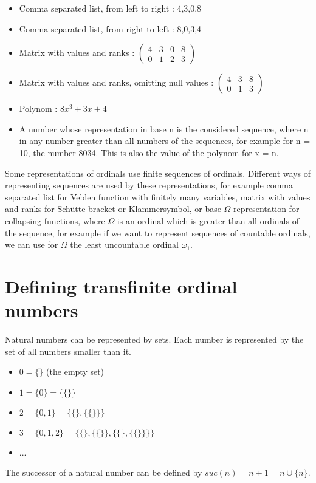 \documentclass[10pt]{article}
\begin{document}
\begin{itemize}
     \setlength{\itemsep}{1pt}
     \setlength{\parskip}{0pt}
     \setlength{\parsep}{0pt}
\item Comma separated list, from left to right : 4,3,0,8
\item Comma separated list, from right to left : 8,0,3,4
\item Matrix with values and ranks :
\(
  \begin{pmatrix}
    4 & 3 & 0 & 8 \\
    0 & 1 & 2 & 3
  \end{pmatrix}
\)
\item Matrix with values and ranks, omitting null values :
\(
  \begin{pmatrix}
    4 & 3 & 8 \\
    0 & 1 & 3
  \end{pmatrix}
\)
\item Polynom : \( 8 x^3 + 3 x + 4 \)
\item A number whose representation in base n is the considered sequence, where n in any number greater than all numbers of the sequences, for example for n = 10, the number 8034. This is also the value of the polynom for x = n.
\end{itemize}

Some representations of ordinals use finite sequences of ordinals. Different ways of representing sequences are used by these representations, for example comma separated list for Veblen function with finitely many variables, matrix with values and ranks for Schütte bracket or Klammersymbol, or base \( \Omega \) representation for collapsing functions, where \( \Omega \) is an ordinal which is greater than all ordinals of the sequence, for example if we want to represent sequences of countable ordinals, we can use for \( \Omega \) the least uncountable ordinal \( \omega_1 \).

\section{Defining transfinite ordinal numbers}

Natural numbers can be represented by sets. Each number is represented by the set of all numbers smaller than it.
\begin{itemize}
     \setlength{\itemsep}{1pt}
     \setlength{\parskip}{0pt}
     \setlength{\parsep}{0pt}
\item \( 0 = \lbrace\rbrace \) (the empty set)
\item \( 1 = \lbrace 0 \rbrace = \lbrace\lbrace\rbrace\rbrace \)
\item \( 2 = \lbrace 0, 1 \rbrace = \lbrace\lbrace\rbrace,\lbrace\lbrace\rbrace\rbrace\rbrace \)
\item \( 3 = \lbrace 0, 1, 2 \rbrace = \lbrace\lbrace\rbrace,\lbrace\lbrace\rbrace\rbrace,\lbrace\lbrace\rbrace,\lbrace\lbrace\rbrace\rbrace\rbrace\rbrace \)
\item ...
\end{itemize}
The successor of a natural number can be defined by \( suc(n) = n+1 = n \cup \lbrace n \rbrace \).
\end{document}
